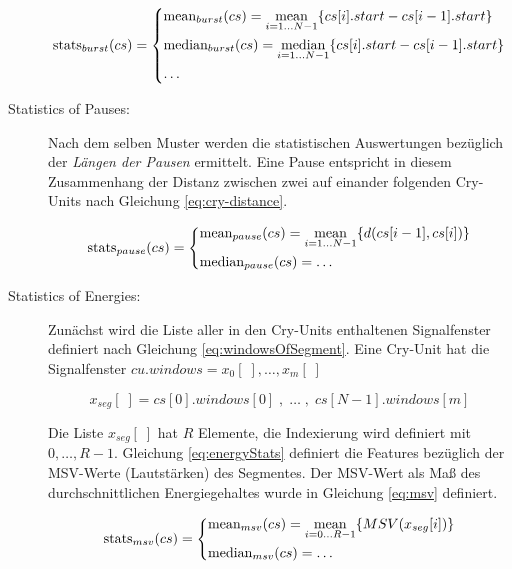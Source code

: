\begin{description}
\begin{equation}
\text{stats}_{burst}(cs) = 
\begin{dcases}
\text{mean}_{burst}(cs) = \operatorname*{mean}_{i = 1 \ldots N-1}\{cs[i].start - cs[i-1].start\} \\
\text{median}_{burst}(cs) = \operatorname*{median}_{i = 1 \ldots N-1}\{cs[i].start - cs[i-1].start\} \\
\ldots
\end{dcases}
\label{eq:featuresOfBursts}
\end{equation}

\item[Statistics of Pauses:] Nach dem selben Muster werden die statistischen Auswertungen bezüglich der  \emph{Längen der Pausen} ermittelt. Eine Pause entspricht in diesem Zusammenhang der Distanz zwischen zwei auf einander folgenden Cry-Units nach Gleichung \ref{eq:cry-distance}.

\begin{equation}
\text{stats}_{pause}(cs) = 
\begin{dcases}
\text{mean}_{pause}(cs) = \operatorname*{mean}_{i = 1 \ldots N-1}\{d(cs[i-1],cs[i])\} \\
\text{median}_{pause}(cs)  = \ldots
\end{dcases}
\end{equation}

\item[Statistics of Energies:] Zunächst wird die Liste aller in den Cry-Units enthaltenen Signalfenster definiert nach Gleichung \ref{eq:windowsOfSegment}. Eine Cry-Unit hat die Signalfenster $cu.windows = x_0[\;],\ldots,x_m[\;]$

\begin{equation}
x_{seg}[\; ] = cs[0].windows[0] \;  , \; \ldots \; , \; cs[N-1].windows[m] 
\label{eq:windowsOfSegment}
\end{equation}

Die Liste $x_{seg}[\; ]$ hat $R$ Elemente, die Indexierung wird definiert mit $0, \ldots, R-1$. Gleichung \ref{eq:energyStats} definiert die Features bezüglich der MSV-Werte (\glqq Lautstärken\grqq ) des Segmentes. Der MSV-Wert als Maß des durchschnittlichen Energiegehaltes wurde in Gleichung \ref{eq:msv} definiert.

\begin{equation}
\text{stats}_{msv}(cs) = 
\begin{dcases}
\text{mean}_{msv}(cs) = \operatorname*{mean}_{i = 0 \ldots R-1}\{MSV(x_{seg}[i])\} \\
\text{median}_{msv}(cs)  = \ldots
\end{dcases}
\label{eq:energyStats}
\end{equation}

\end{description}

